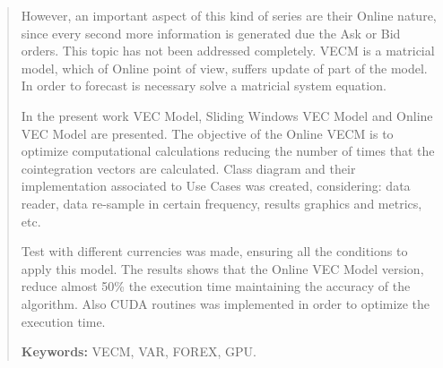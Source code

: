 \begin{quotation}
However, an important aspect of this kind of series are their Online nature,
since every second more information is generated due the Ask or Bid orders.
This topic has not been addressed completely. VECM is a matricial model, which
of Online point of view, suffers update of part of the model. In order
to forecast is necessary solve a matricial system equation.


In the present work VEC Model, Sliding Windows VEC Model and Online VEC Model
are presented. The objective of the Online VECM is to optimize computational
calculations reducing the number of times that the cointegration vectors are
calculated. Class diagram and their implementation associated to Use Cases was
created, considering: data reader, data re-sample in certain frequency, results
graphics and metrics, etc.


Test with different currencies was made, ensuring all the conditions to apply
this model. The results shows that the Online VEC Model version, reduce almost
50\% the execution time maintaining the accuracy of the algorithm. Also CUDA
routines was implemented in order to optimize the execution time.


{\bf Keywords:} VECM, VAR, FOREX, GPU.
\end{quotation}

